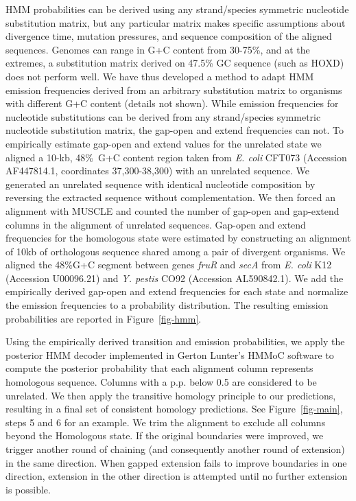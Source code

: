 \documentclass{llncs}
\begin{document}
HMM probabilities can be derived using any strand/species symmetric nucleotide substitution matrix,
but any particular matrix makes specific assumptions about divergence time, mutation pressures,
and sequence composition of the aligned sequences.
Genomes can range in G+C content from 30-75\%, and at the extremes,
a substitution matrix derived on 47.5\% GC sequence (such as HOXD) does not
perform well.  We have thus developed a method to adapt HMM emission
frequencies derived from an arbitrary substitution matrix
to organisms with different G+C content (details not shown).  While emission frequencies for nucleotide substitutions can be derived from
any strand/species symmetric nucleotide substitution matrix, the gap-open
and extend frequencies can not.  To empirically estimate gap-open and extend values
for the unrelated state we aligned a 10-kb, 48\%~G+C content region
taken from \emph{E. coli} CFT073 (Accession AF447814.1, coordinates
37,300-38,300) with an unrelated sequence.  We generated an unrelated
sequence with identical nucleotide composition by reversing the
extracted sequence without complementation.  We then forced an
alignment with MUSCLE and counted the number of gap-open and gap-extend
columns in the alignment of unrelated sequences.  Gap-open and
extend frequencies for the homologous state were estimated by
constructing an alignment of 10kb of orthologous sequence shared among
a pair of divergent organisms.  We aligned the 48\%G+C segment between
genes \textit{fruR} and \textit{secA} from \textit{E. coli} K12
(Accession U00096.21) and \emph{Y. pestis} CO92 (Accession
AL590842.1). We add the empirically derived gap-open and extend
frequencies for each state and normalize the emission frequencies to a
probability distribution.  The resulting emission probabilities are
reported in Figure~\ref{fig-hmm}.

Using the empirically derived transition and emission probabilities,
we apply the posterior HMM decoder implemented in Gerton Lunter's
HMMoC software\cite{Lunter2007} to compute the posterior probability that
each alignment column represents homologous sequence.  Columns with a
p.p. below 0.5 are considered to be unrelated.  We then apply the
transitive homology principle to our predictions, resulting in a final
set of consistent homology predictions.  See Figure~\ref{fig-main},
steps 5 and 6 for an example. We trim the alignment to exclude all
columns beyond the Homologous state. If the original boundaries were
improved, we trigger another round of chaining (and consequently
another round of extension) in the same direction.
When gapped extension fails to improve boundaries
in one direction, extension in the other direction is attempted until
no further extension is possible.
\end{document}

